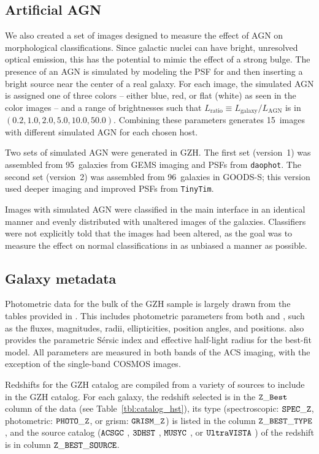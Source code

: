 \documentclass[twocolumn]{aastex6}
\begin{document}
\subsection{Artificial AGN}

We also created a set of images designed to measure the effect of AGN on morphological classifications. Since galactic nuclei can have bright, unresolved optical emission, this has the potential to mimic the effect of a strong bulge. The presence of an AGN is simulated by modeling the PSF for \hst{} and then inserting a bright source near the center of a real galaxy. For each image, the simulated AGN is assigned one of three colors -- either blue, red, or flat (white) as seen in the color images -- and a range of brightnesses such that $L_\mathrm{ratio} \equiv L_\mathrm{galaxy}/L_\mathrm{AGN}$ is in $(0.2,1.0,2.0,5.0,10.0,50.0)$. Combining these parameters generates 15~images with different simulated AGN for each chosen host. 

Two sets of simulated AGN were generated in GZH. The first set (version~1) was assembled from 95~galaxies from GEMS imaging and PSFs from \texttt{daophot}. The second set (version~2) was assembled from 96~galaxies in GOODS-S; this version used deeper imaging and improved PSFs from \texttt{TinyTim}. 

Images with simulated AGN were classified in the main interface in an identical manner and evenly distributed with unaltered images of the galaxies. Classifiers were not explicitly told that the images had been altered, as the goal was to measure the effect on normal classifications in as unbiased a manner as possible. 

\subsection{Galaxy metadata}

Photometric data for the bulk of the GZH sample is largely drawn from the tables provided in \citet{gri12}. This includes photometric parameters from both \sextractor{} and \galfit, such as the fluxes, magnitudes, radii, ellipticities, position angles, and positions. \galfit{} also provides the parametric S\'{e}rsic index and effective half-light radius for the best-fit model. All parameters are measured in both bands of the ACS imaging, with the exception of the single-band COSMOS images.

Redshifts for the GZH catalog are compiled from a variety of sources to include in the GZH catalog. For each galaxy, the redshift selected is in the $\tt Z\_Best$ column of the data (see Table~\ref{tbl:catalog_hst}), its type (spectroscopic: $\tt SPEC\_Z$, photometric: $\tt PHOTO\_Z$, or grism: $ \tt GRISM\_Z$) is listed in the column $\tt Z\_BEST\_TYPE$, and the source catalog ($\tt ACSGC$ \citep{gri12}, $\tt 3DHST$ \citep{mom15}, $\tt MUSYC$ \citep{car10}, or $\tt UltraVISTA$ \citep{ilb13}) of the redshift is in column $\tt Z\_BEST\_SOURCE$.
\end{document}
